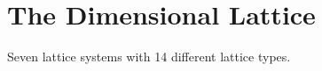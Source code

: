 \chapter{The Dimensional Lattice}\label{chap3}

Seven lattice systems with 14 different lattice types.

